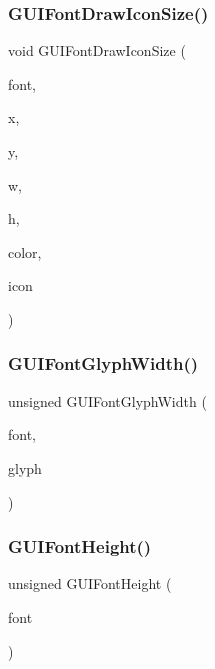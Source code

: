 \subsubsection{\texorpdfstring{G\+U\+I\+Font\+Draw\+Icon\+Size()}{GUIFontDrawIconSize()}}
{\footnotesize\ttfamily void G\+U\+I\+Font\+Draw\+Icon\+Size (\begin{DoxyParamCaption}\item[{const struct G\+U\+I\+Font $\ast$}]{font,  }\item[{\mbox{\hyperlink{ioapi_8h_a787fa3cf048117ba7123753c1e74fcd6}{int}}}]{x,  }\item[{\mbox{\hyperlink{ioapi_8h_a787fa3cf048117ba7123753c1e74fcd6}{int}}}]{y,  }\item[{\mbox{\hyperlink{ioapi_8h_a787fa3cf048117ba7123753c1e74fcd6}{int}}}]{w,  }\item[{\mbox{\hyperlink{ioapi_8h_a787fa3cf048117ba7123753c1e74fcd6}{int}}}]{h,  }\item[{uint32\+\_\+t}]{color,  }\item[{enum G\+U\+I\+Icon}]{icon }\end{DoxyParamCaption})}

\mbox{\label{wii_2gui-font_8c_a4b38c72440f93dd3f4c6d01848a23203}} 
\subsubsection{\texorpdfstring{G\+U\+I\+Font\+Glyph\+Width()}{GUIFontGlyphWidth()}}
{\footnotesize\ttfamily unsigned G\+U\+I\+Font\+Glyph\+Width (\begin{DoxyParamCaption}\item[{const struct G\+U\+I\+Font $\ast$}]{font,  }\item[{uint32\+\_\+t}]{glyph }\end{DoxyParamCaption})}

\mbox{\label{wii_2gui-font_8c_a6d539c7b23450b8918bb6499e2c11042}} 
\subsubsection{\texorpdfstring{G\+U\+I\+Font\+Height()}{GUIFontHeight()}}
{\footnotesize\ttfamily unsigned G\+U\+I\+Font\+Height (\begin{DoxyParamCaption}\item[{const struct G\+U\+I\+Font $\ast$}]{font }\end{DoxyParamCaption})}

